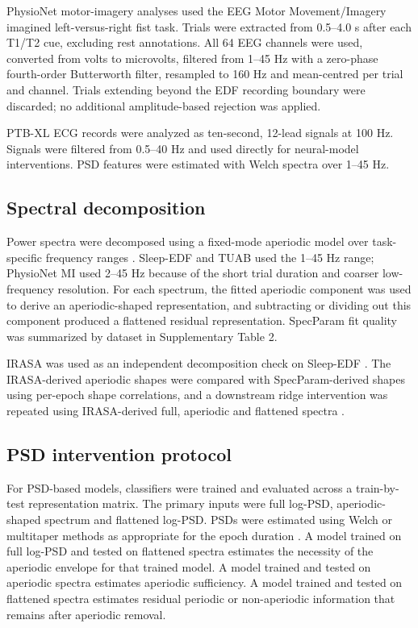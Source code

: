 \documentclass[pdflatex,sn-nature]{sn-jnl}
\begin{document}
PhysioNet motor-imagery analyses used the EEG Motor Movement/Imagery imagined left-versus-right fist task. Trials were extracted from 0.5--4.0 s after each T1/T2 cue, excluding rest annotations. All 64 EEG channels were used, converted from volts to microvolts, filtered from 1--45 Hz with a zero-phase fourth-order Butterworth filter, resampled to 160 Hz and mean-centred per trial and channel. Trials extending beyond the EDF recording boundary were discarded; no additional amplitude-based rejection was applied.

PTB-XL ECG records were analyzed as ten-second, 12-lead signals at 100 Hz. Signals were filtered from 0.5--40 Hz and used directly for neural-model interventions. PSD features were estimated with Welch spectra over 1--45 Hz.

\subsection{Spectral decomposition}

Power spectra were decomposed using a fixed-mode aperiodic model over task-specific frequency ranges \cite{donoghue2020parameterizing}. Sleep-EDF and TUAB used the 1--45 Hz range; PhysioNet MI used 2--45 Hz because of the short trial duration and coarser low-frequency resolution. For each spectrum, the fitted aperiodic component was used to derive an aperiodic-shaped representation, and subtracting or dividing out this component produced a flattened residual representation. SpecParam fit quality was summarized by dataset in Supplementary Table 2.

IRASA was used as an independent decomposition check on Sleep-EDF \cite{wen2016separating}. The IRASA-derived aperiodic shapes were compared with SpecParam-derived shapes using per-epoch shape correlations, and a downstream ridge intervention was repeated using IRASA-derived full, aperiodic and flattened spectra \cite{gerster2022separating}.

\subsection{PSD intervention protocol}

For PSD-based models, classifiers were trained and evaluated across a train-by-test representation matrix. The primary inputs were full log-PSD, aperiodic-shaped spectrum and flattened log-PSD. PSDs were estimated using Welch or multitaper methods as appropriate for the epoch duration \cite{welch1967use,thomson1982spectrum}. A model trained on full log-PSD and tested on flattened spectra estimates the necessity of the aperiodic envelope for that trained model. A model trained and tested on aperiodic spectra estimates aperiodic sufficiency. A model trained and tested on flattened spectra estimates residual periodic or non-aperiodic information that remains after aperiodic removal.
\end{document}
